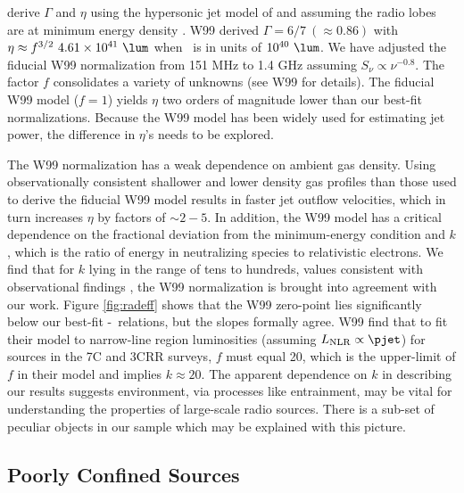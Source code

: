 \documentclass{emulateapj}
\begin{document}
\citet[][hereafter W99]{1999MNRAS.309.1017W} derive $\Gamma$ and
$\eta$ using the hypersonic jet model of \citet{1991MNRAS.250..581F}
and assuming the radio lobes are at minimum energy density
\citep[see][for details]{1980ARA&A..18..165M}. W99 derived $\Gamma =
6/7 ~(\approx 0.86)$ with $\eta \approx f^{3/2}~4.61 \times 10^{41}
~\lum$ when \prad\ is in units of $10^{40} ~\lum$. We have adjusted
the fiducial W99 normalization from 151 MHz to 1.4 GHz assuming
$S_{\nu} \propto \nu^{-0.8}$. The factor $f$ consolidates a variety of
unknowns (see W99 for details). The fiducial W99 model ($f=1$) yields
$\eta$ two orders of magnitude lower than our best-fit
normalizations. Because the W99 model has been widely used for
estimating jet power, the difference in $\eta$'s needs to be explored.

The W99 normalization has a weak dependence on ambient gas density.
Using observationally consistent shallower and lower density gas
profiles than those used to derive the fiducial W99 model results in
faster jet outflow velocities, which in turn increases $\eta$ by
factors of $\sim 2-5$. In addition, the W99 model has a critical
dependence on the fractional deviation from the minimum-energy
condition and $k$, which is the ratio of energy in neutralizing
species to relativistic electrons. We find that for $k$ lying in the
range of tens to hundreds, values consistent with observational
findings \citep{2005MNRAS.364.1343D, 2006MNRAS.372.1741D,
  2006ApJ...648..200D, birzan08}, the W99 normalization is brought
into agreement with our work. Figure \ref{fig:radeff} shows that the
W99 zero-point lies significantly below our best-fit
\pjet-\prad\ relations, but the slopes formally agree. W99 find that
to fit their model to narrow-line region luminosities (assuming
$L_{\mathrm{NLR}} \propto \pjet$) for sources in the 7C and 3CRR
surveys, $f$ must equal 20, which is the upper-limit of $f$ in their
model and implies $k \approx 20$. The apparent dependence on $k$ in
describing our results suggests environment, via processes like
entrainment, may be vital for understanding the properties of
large-scale radio sources. There is a sub-set of peculiar objects in
our sample which may be explained with this picture.

\subsection{Poorly Confined Sources}
\label{sec:jet}
\end{document}
